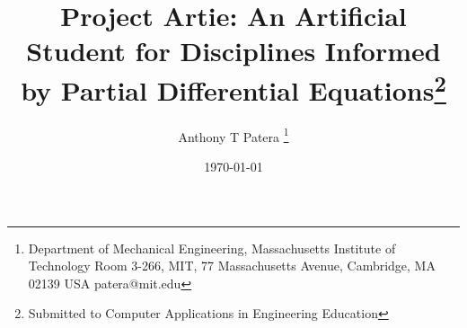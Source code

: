 \documentclass[preprint,12pt]{article}
\title{Project Artie: An Artificial Student for Disciplines Informed by Partial Differential Equations\thanks{Submitted to Computer Applications in Engineering Education}}
\date \today
\author{Anthony T Patera \thanks{Department of Mechanical Engineering, Massachusetts Institute of Technology \newline \mbox{}\hspace{.21in} Room 3-266, MIT, 77 Massachusetts Avenue, Cambridge, MA 02139 USA \newline \mbox{}\hspace{.20in} patera@mit.edu} }
\begin{document}
\maketitle

\begin{abstract}

%
%


\end{abstract}
\end{document}
